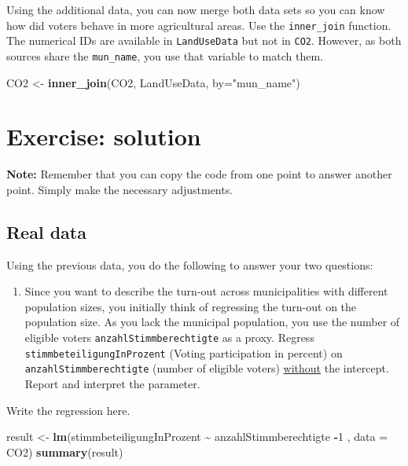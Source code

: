 \documentclass[
]{book}
\newenvironment{Shaded}{\begin{snugshade}}{\end{snugshade}}
\newcommand{\AttributeTok}[1]{\textcolor[rgb]{0.13,0.29,0.53}{#1}}
\newcommand{\DecValTok}[1]{\textcolor[rgb]{0.00,0.00,0.81}{#1}}
\newcommand{\FunctionTok}[1]{\textcolor[rgb]{0.13,0.29,0.53}{\textbf{#1}}}
\newcommand{\NormalTok}[1]{#1}
\newcommand{\OtherTok}[1]{\textcolor[rgb]{0.56,0.35,0.01}{#1}}
\newcommand{\SpecialCharTok}[1]{\textcolor[rgb]{0.81,0.36,0.00}{\textbf{#1}}}
\newcommand{\StringTok}[1]{\textcolor[rgb]{0.31,0.60,0.02}{#1}}
\providecommand{\tightlist}{%
  \setlength{\itemsep}{0pt}\setlength{\parskip}{0pt}}
\begin{document}
Using the additional data, you can now merge both data sets so you can know how did voters behave in more agricultural areas. Use the \texttt{inner\_join} function. The numerical IDs are available in \texttt{LandUseData} but not in \texttt{CO2}. However, as both sources share the \texttt{mun\_name}, you use that variable to match them.

\begin{Shaded}
\begin{Highlighting}[]
\NormalTok{CO2 }\OtherTok{\textless{}{-}} \FunctionTok{inner\_join}\NormalTok{(CO2, LandUseData, }\AttributeTok{by=}\StringTok{"mun\_name"}\NormalTok{)  }
\end{Highlighting}
\end{Shaded}

\hypertarget{exercise-solution}{%
\section{Exercise: solution}\label{exercise-solution}}

\textbf{Note:} Remember that you can copy the code from one point to answer another point. Simply make the necessary adjustments.

\hypertarget{real-data}{%
\subsection{Real data}\label{real-data}}

Using the previous data, you do the following to answer your two questions:

\begin{enumerate}
\def\labelenumi{\roman{enumi}.}
\tightlist
\item
  Since you want to describe the turn-out across municipalities with different population sizes, you initially think of regressing the turn-out on the population size. As you lack the municipal population, you use the number of eligible voters \texttt{anzahlStimmberechtigte} as a proxy. Regress \texttt{stimmbeteiligungInProzent} (Voting participation in percent) on \texttt{anzahlStimmberechtigte} (number of eligible voters) \href{https://www.geeksforgeeks.org/remove-intercept-from-regression-model-in-r/}{without} the intercept. Report and interpret the parameter.
\end{enumerate}

Write the regression here.

\begin{Shaded}
\begin{Highlighting}[]
\NormalTok{result }\OtherTok{\textless{}{-}} \FunctionTok{lm}\NormalTok{(stimmbeteiligungInProzent }\SpecialCharTok{\textasciitilde{}}\NormalTok{ anzahlStimmberechtigte }\SpecialCharTok{{-}}\DecValTok{1}\NormalTok{ , }\AttributeTok{data =}\NormalTok{ CO2)}
\FunctionTok{summary}\NormalTok{(result)}
\end{Highlighting}
\end{Shaded}
\end{document}
